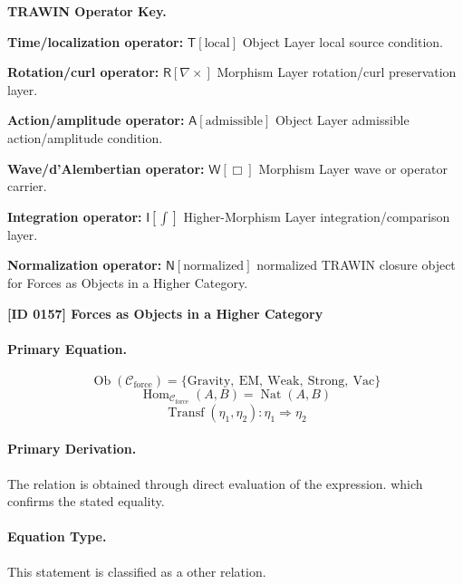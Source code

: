 \par\vspace{0.45\baselineskip}
\noindent\begin{minipage}[t]{\linewidth}
\begingroup
\small
\raggedright
\textbf{TRAWIN Operator Key.}\par
\noindent\textbf{Time/localization operator:} $\mathsf{T}\!\left[\mathrm{local}\right]$ Object Layer local source condition.\par
\noindent\textbf{Rotation/curl operator:} $\mathsf{R}\!\left[\nabla\times\right]$ Morphism Layer rotation/curl preservation layer.\par
\noindent\textbf{Action/amplitude operator:} $\mathsf{A}\!\left[\mathrm{admissible}\right]$ Object Layer admissible action/amplitude condition.\par
\noindent\textbf{Wave/d'Alembertian operator:} $\mathsf{W}\!\left[\Box\right]$ Morphism Layer wave or operator carrier.\par
\noindent\textbf{Integration operator:} $\mathsf{I}\!\left[\int\right]$ Higher-Morphism Layer integration/comparison layer.\par
\noindent\textbf{Normalization operator:} $\mathsf{N}\!\left[\mathrm{normalized}\right]$ normalized TRAWIN closure object for Forces as Objects in a Higher Category.\par
\endgroup
\end{minipage}

\clearpage
\noindent\textbf{[ID 0157] Forces as Objects in a Higher Category}\par
\vspace{0.35em}
\paragraph{Primary Equation.}
\[
\operatorname{Ob}(\mathcal{C}_{\mathrm{force}})
=
\{\mathrm{Gravity},\ \mathrm{EM},\ \mathrm{Weak},\ \mathrm{Strong},\ \mathrm{Vac}\}
\]
\[
\operatorname{Hom}_{\mathcal{C}_{\mathrm{force}}}(A,B)
=
\operatorname{Nat}(A,B)
\]
\[
\operatorname{Transf}(\eta_1,\eta_2)
:\eta_1\Rightarrow \eta_2
\]

\paragraph{Primary Derivation.}
The relation is obtained through direct evaluation of the expression. which confirms the stated equality.
\paragraph{Equation Type.}
This statement is classified as a other relation.

